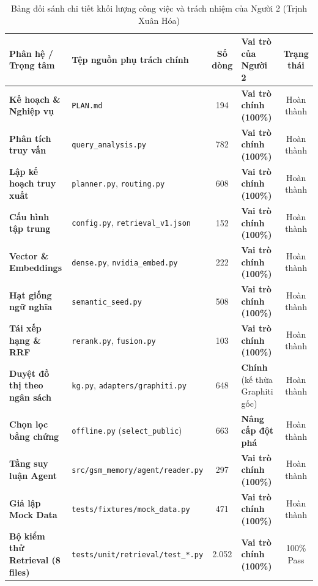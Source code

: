 \documentclass[a4paper,11pt]{article}
\begin{document}
\begin{table}[!htbp]
\centering
\scriptsize
\caption{Bảng đối sánh chi tiết khối lượng công việc và trách nhiệm của Người 2 (Trịnh Xuân Hóa)}
\label{tab:contributions}
\vspace{0.15cm}
\begin{tabularx}{\textwidth}{l>{\raggedright\arraybackslash}Xc>{\raggedright\arraybackslash}p{2.8cm}c}
\toprule
\textbf{Phân hệ / Trọng tâm} & \textbf{Tệp nguồn phụ trách chính} & \textbf{Số dòng} & \textbf{Vai trò của Người 2} & \textbf{Trạng thái} \\
\midrule
\textbf{Kế hoạch \& Nghiệp vụ} & \nolinkurl{PLAN.md} & 194 & \textbf{Vai trò chính (100\%)} & Hoàn thành \\
\textbf{Phân tích truy vấn} & \nolinkurl{query_analysis.py} & 782 & \textbf{Vai trò chính (100\%)} & Hoàn thành \\
\textbf{Lập kế hoạch truy xuất} & \nolinkurl{planner.py}, \nolinkurl{routing.py} & 608 & \textbf{Vai trò chính (100\%)} & Hoàn thành \\
\textbf{Cấu hình tập trung} & \nolinkurl{config.py}, \nolinkurl{retrieval_v1.json} & 152 & \textbf{Vai trò chính (100\%)} & Hoàn thành \\
\textbf{Vector \& Embeddings} & \nolinkurl{dense.py}, \nolinkurl{nvidia_embed.py} & 222 & \textbf{Vai trò chính (100\%)} & Hoàn thành \\
\textbf{Hạt giống ngữ nghĩa} & \nolinkurl{semantic_seed.py} & 508 & \textbf{Vai trò chính (100\%)} & Hoàn thành \\
\textbf{Tái xếp hạng \& RRF} & \nolinkurl{rerank.py}, \nolinkurl{fusion.py} & 103 & \textbf{Vai trò chính (100\%)} & Hoàn thành \\
\textbf{Duyệt đồ thị theo ngân sách} & \nolinkurl{kg.py}, \nolinkurl{adapters/graphiti.py} & 648 & \textbf{Chính} (kế thừa Graphiti gốc) & Hoàn thành \\
\textbf{Chọn lọc bằng chứng} & \nolinkurl{offline.py} (\nolinkurl{select_public}) & 663 & \textbf{Nâng cấp đột phá} & Hoàn thành \\
\textbf{Tầng suy luận Agent} & \nolinkurl{src/gsm_memory/agent/reader.py} & 297 & \textbf{Vai trò chính (100\%)} & Hoàn thành \\
\textbf{Giả lập Mock Data} & \nolinkurl{tests/fixtures/mock_data.py} & 471 & \textbf{Vai trò chính (100\%)} & Hoàn thành \\
\textbf{Bộ kiểm thử Retrieval (8 files)} & \nolinkurl{tests/unit/retrieval/test_*.py} & 2.052 & \textbf{Vai trò chính (100\%)} & 100\% Pass \\

\end{tabularx}
\end{table}
\end{document}
